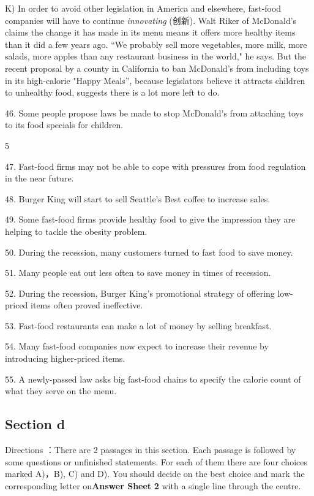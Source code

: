 \documentclass[UTF8,11pt]{ctexart}
\begin{document}
K) In order to avoid other legislation in America and elsewhere, fast-food companies will have to continue\textit{ innovating} (创新). Walt Riker of McDonald’s claims the change it has made in its menu means it offers more healthy items than it did a few years ago. “We probably sell more vegetables, more milk, more salads, more apples than any restaurant business in the world," he says. But the recent proposal by a county in California to ban McDonald’s from including toys in its high-calorie "Happy Meals”, because legislators believe it attracts children to unhealthy food, suggests there is a lot more left to do.


46. Some people propose laws be made to stop McDonald’s from attaching toys to its food specials for children.


5


47. Fast-food firms may not be able to cope with pressures from food regulation in the near future.


48. Burger King will start to sell Seattle’s Best coffee to increase sales.


49. Some fast-food firms provide healthy food to give the impression they are helping to tackle the obesity problem.


50. During the recession, many customers turned to fast food to save money.


51. Many people eat out less often to save money in times of recession.


52. During the recession, Burger King’s promotional strategy of offering low-priced items often proved ineffective.


53. Fast-food restaurants can make a lot of money by selling breakfast.


54. Many fast-food companies now expect to increase their revenue by introducing higher-priced items.


55. A newly-passed law asks big fast-food chains to specify the calorie count of what they serve on the menu.


\subsection*{Section d}


Directions ：There are 2 passages in this section. Each passage is followed by some questions or unfinished statements. For each of them there are four choices marked A)，B), C) and D). You should decide on the best choice and mark the corresponding letter on\textbf{Answer Sheet} \textbf{2} with a single line through the centre.
\end{document}
